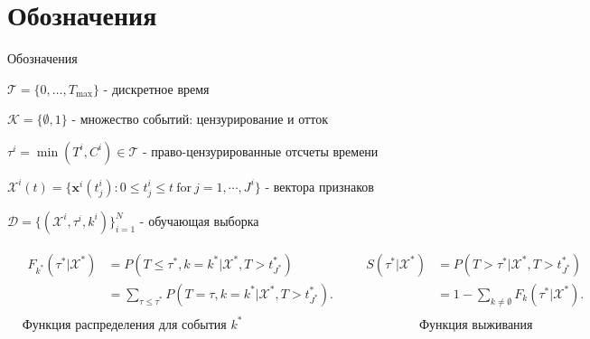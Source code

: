 \documentclass[10pt,pdf,hyperref={unicode}]{beamer}
\begin{document}
\section{Обозначения}
\begin{frame}{Обозначения}


$\mathcal{T}=\{0,\ldots,T_{\max}\}$ - дискретное время

$\mathcal{K}=\{\emptyset,1\}$ - множество событий: цензурирование и отток

$\tau^i=\min(T^i,C^i) \in\mathcal{T} $ - право-цензурированные отсчеты времени

$\mathcal{X}^i(t)=\{\mathbf{x}^i(t_j^i):0\leq t_j^i\leq t\mathrm{~for~}j=1,\cdots,J^i\}$ - вектора признаков 

$\mathcal{D}=\{(\mathcal{X}^i,\tau^{i},k^{i})\}_{i=1}^{N}$ - обучающая выборка



{\fontsize{8.5}{10}\selectfont
	\begin{align*}
		& \begin{aligned}
			F_{k^{*}}(\tau^{*}|\mathcal{X}^{*}) & = P(T\leq\tau^{*},k=k^{*}|\mathcal{X}^{*},T>t_{J^{*}}^{*}) \\
			& =\sum_{\tau\leq\tau^*}P(T=\tau,k=k^*|\mathcal{X}^*,T>t_{J^*}^*).
		\end{aligned}
		\quad
		& \begin{aligned}
			S(\tau^{*}|\mathcal{X}^{*}) & = P(T>\tau^*|\mathcal{X}^{*},T>t_{J^*}^{*}) \\
			& =1-\sum_{k\neq\emptyset}F_k(\tau^*|\mathcal{X}^{*}).
		\end{aligned} \\
		& \text{Функция распределения для события $k^*$}
		& \hspace{55pt} \text{Функция выживания}
	\end{align*}
}



\end{frame}


\end{document}
